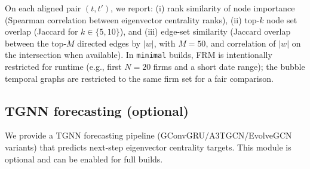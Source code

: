 On each aligned pair $(t,t')$, we report: (i) rank similarity of node importance (Spearman correlation between eigenvector centrality ranks), (ii) top-$k$ node set overlap (Jaccard for $k \in \{5,10\}$), and (iii) edge-set similarity (Jaccard overlap between the top-$M$ directed edges by $|w|$, with $M=50$, and correlation of $|w|$ on the intersection when available).
In \texttt{minimal} builds, FRM is intentionally restricted for runtime (e.g., first $N=20$ firms and a short date range); the bubble temporal graphs are restricted to the same firm set for a fair comparison.

\subsection{TGNN forecasting (optional)}

We provide a TGNN forecasting pipeline (GConvGRU/A3TGCN/EvolveGCN variants) that predicts next-step eigenvector centrality targets.
This module is optional and can be enabled for full builds.
